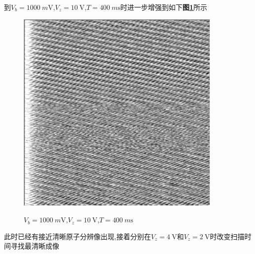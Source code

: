 \documentclass[a4paper]{article}
\begin{document}
到$V_b=\SI{1000}{m\volt}$,$V_z=\SI{10}{\volt}$,$T=\SI{400}{m\s}$时进一步增强到如下\textbf{图\ref{result:fig3}}所示
\begin{figure}[H]
 \centering
 \caption{$V_b=\SI{1000}{m\volt}$,$V_z=\SI{10}{\volt}$,$T=\SI{400}{m\s}$}
 \includegraphics[height=10cm, width=10cm]{images/10V-1000mV-400ms.png}
 \label{result:fig3}
\end{figure}
此时已经有接近清晰原子分辨像出现,接着分别在$V_z=\SI{4}{\volt}$和$V_z=\SI{2}{\volt}$时改变扫描时间寻找最清晰成像
\end{document}
